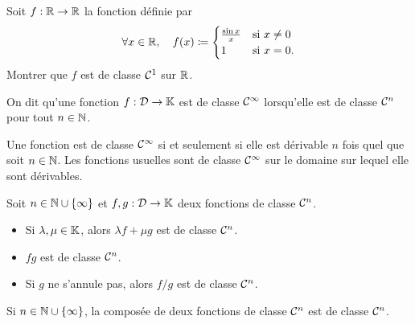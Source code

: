 \documentclass{magnolia}
\begin{document}
\begin{exoUnique}
\exo Soit $f:\mathbb{R}\to\mathbb{R}$ la fonction définie par
  \[\forall x\in\mathbb{R},\quad f(x)\coloneqq\begin{cases}\frac{\sin x}{x} & \text{si $x\neq 0$}\\1&\text{si $x=0$.}\end{cases}\]
  Montrer que $f$ est de classe $\mathcal{C}^{1}$ sur $\mathbb{R}$.
\end{exoUnique}

\begin{definition}[utile=-3]
On dit qu'une fonction $f:\mathcal{D}\to\mathbb{K}$ est de classe $\mathcal{C}^{\infty}$ lorsqu'elle est de
classe $\mathcal{C}^{n}$ pour tout $n\in\mathbb{N}$.
\end{definition}

\begin{remarques}
\remarque Une fonction est de classe $\mathcal{C}^{\infty}$ si et seulement si elle
  est dérivable $n$ fois quel que soit $n\in\mathbb{N}$.
\remarque Les fonctions usuelles sont de classe $\mathcal{C}^{\infty}$
  sur le domaine sur lequel elle sont dérivables.
\end{remarques}


\begin{proposition}[utile=-3]
Soit $n\in\mathbb{N}\cup\left\{\infty\right\}$ et $f, g:\mathcal{D}\to\mathbb{K}$ deux fonctions de classe $\mathcal{C}^{n}$.
\begin{itemize}
\item Si $\lambda,\mu\in\mathbb{K}$, alors $\lambda f+\mu g$ est de classe
  $\mathcal{C}^{n}$.
\item $fg$ est de classe $\mathcal{C}^{n}$.
\item Si $g$ ne s'annule pas, alors $f/g$ est de classe $\mathcal{C}^{n}$.
\end{itemize}
\end{proposition}

\begin{proposition}[utile=-3]
Si $n\in\mathbb{N}\cup\left\{\infty\right\}$, la composée de deux fonctions de classe $\mathcal{C}^{n}$ est de classe
$\mathcal{C}^{n}$.
\end{proposition}
\end{document}
